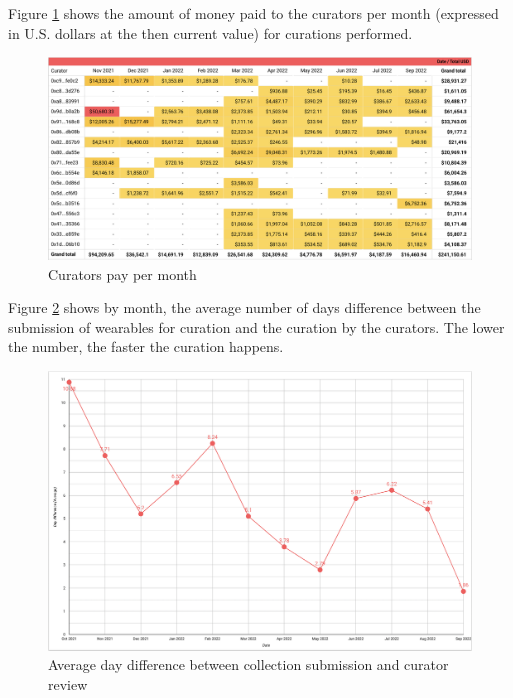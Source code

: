 \documentclass[MSE,Master,english]{twbook}%
\begin{document}
Figure \ref{fig:curators_pay} shows the amount of money paid to the curators per month (expressed in U.S. dollars at the then current value) for curations performed.
\begin{figure}[H]
  \centering
  \includegraphics[width=\textwidth]{metrics/curators_pay.png}
  \caption{Curators pay per month}
  \label{fig:curators_pay}
\end{figure}

Figure \ref{fig:day_difference} shows by month, the average number of days difference between the submission of wearables for curation and the curation by the curators. The lower the number, the faster the curation happens.
\begin{figure}[H]
  \centering
  \includegraphics[width=\textwidth]{metrics/day_difference.png}
  \caption{Average day difference between collection submission and curator review}
  \label{fig:day_difference}
\end{figure}
\end{document}
